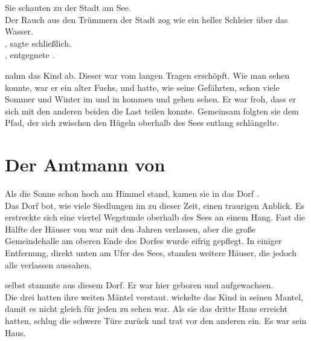 \begin{Large}
Sie schauten zu der Stadt am See.\\
Der Rauch aus den Trümmern der Stadt {\Tern} zog wie ein heller Schleier über das Wasser.\\
, sagte {\Eno} schließlich.  
\\
, entgegnete {\Bomar}.\\

{\Bomar} nahm {\Eno} das Kind ab. Dieser war vom langen Tragen erschöpft. Wie man sehen konnte, war er ein alter Fuchs, und hatte, wie seine Gefährten, schon viele Sommer und Winter im {\Enland} und in {\Rhingell} kommen und gehen sehen. Er war froh, dass er sich mit den anderen beiden die Last teilen konnte. Gemeinsam folgten sie dem Pfad, der sich zwischen den Hügeln oberhalb des Sees entlang schlängelte.

\chapter{Der Amtmann von {\Berna}}
Als die Sonne schon hoch am Himmel stand, kamen sie in das Dorf {\Berna}.\\
Das Dorf bot, wie viele Siedlungen im {\Enland} zu dieser Zeit, einen traurigen Anblick. Es erstreckte sich eine viertel Wegstunde oberhalb des Sees an einem Hang. Fast die Hälfte der Häuser von {\Berna} war mit den Jahren verlassen, aber die große Gemeindehalle am oberen Ende des Dorfes wurde eifrig gepflegt. In einiger Entfernung, direkt unten am Ufer des Sees, standen weitere Häuser, die jedoch alle verlassen aussahen.

{\Bomar} selbst stammte aus diesem Dorf. Er war hier geboren und aufgewachsen.\\
Die drei {\Schattenlaufer} hatten ihre weiten Mäntel verstaut. {\Eno} wickelte das Kind in seinen Mantel, damit es nicht gleich für jeden zu sehen war. Als sie das dritte Haus erreicht hatten, schlug {\Bomar} die schwere Türe zurück und trat vor den anderen ein. Es war sein Haus.


\end{Large}
